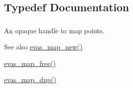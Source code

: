 \subsection{Typedef Documentation}
\subsubsection[{Evas\_\-Map}]{}\label{group__Evas__Object__Group__Map_gae94fcea124ae4135e8bb15a014b334dc}


An opaque handle to map points. 

\begin{DoxySeeAlso}{See also}
\hyperlink{Evas_8h_a719acc4f4792236f7031664ec450b399}{evas\_\-map\_\-new()} 

\hyperlink{Evas_8h_a78ecdf799f326e1c17aae6770c06058a}{evas\_\-map\_\-free()} 

\hyperlink{Evas_8h_a25ffe0dd36fed0c9c492d636b163390a}{evas\_\-map\_\-dup()} 
\end{DoxySeeAlso}
